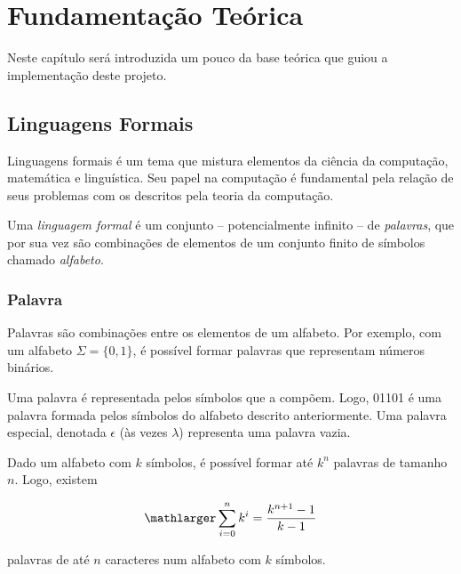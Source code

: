 \documentclass[a4paper,12pt,oneside,onecolumn]{uerj}
\begin{document}
\chapter{Fundamentação Teórica}\label{cap:theory}

Neste capítulo será introduzida um pouco da base teórica que guiou a implementação deste projeto.

\section{Linguagens Formais}

Linguagens formais é um tema que mistura elementos da ciência da computação, matemática e linguística. Seu papel na computação é fundamental pela relação de seus problemas com os descritos pela teoria da computação.

Uma \emph{linguagem formal} é um conjunto -- potencialmente infinito -- de \emph{palavras}, que por sua vez são combinações de elementos de um conjunto finito de símbolos chamado \emph{alfabeto}.

\subsection{Palavra}

Palavras são combinações entre os elementos de um alfabeto. Por exemplo, com um alfabeto $\Sigma = \{0, 1\}$, é possível formar palavras que representam números binários.

Uma palavra é representada pelos símbolos que a compõem. Logo, 01101 é uma palavra formada pelos símbolos do alfabeto descrito anteriormente. Uma palavra especial, denotada $\epsilon$ (às vezes $\lambda$) representa uma palavra vazia.

Dado um alfabeto com $k$ símbolos, é possível formar até $k^n$ palavras de tamanho $n$. Logo, existem

\begin{equation*}
	\mathlarger \sum^{n}_{i=0} k^i = \frac{k^{n+1}-1}{k-1}
\end{equation*}

palavras de até $n$ caracteres num alfabeto com $k$ símbolos.
\end{document}
